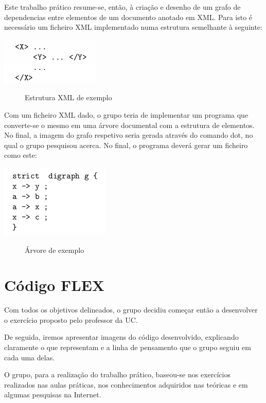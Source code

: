 \documentclass[a4paper]{article}
\begin{document}
Este trabalho prático resume-se, então, à criação e desenho de um grafo de dependencias entre elementos de um documento anotado em XML.
Para isto é necessário um ficheiro XML implementado numa estrutura semelhante à seguinte:

\begin{center}
	\includegraphics{enunciado1}
	\begin{figure}[!ht]
	\caption{Estrutura XML de exemplo}
	\end{figure}
\end{center}

Com um ficheiro XML dado, o grupo teria de implementar um programa que converte-se o mesmo em uma árvore documental com a estrutura de elementos. No final, a imagem do grafo respetivo seria gerada através do comando dot, no qual o grupo pesquisou acerca.
No final, o programa deverá gerar um ficheiro como este:

\begin{center}
	\includegraphics{enunciado2}
	\begin{figure}[!ht]
	\caption{Árvore de exemplo}
	\end{figure}
\end{center}

\section{Código FLEX}
\label{sec:flex}

Com todos os objetivos delineados, o grupo decidiu começar então a desenvolver o exercício proposto pelo professor da UC.

De seguida, iremos apresentar imagens do código desenvolvido, explicando claramente o que representam e a linha de pensamento que o grupo seguiu em cada uma delas.

O grupo, para a realização do trabalho prático, baseou-se nos exercícios realizados nas aulas práticas, nos conhecimentos adquiridos nas teóricas e em algumas pesquisas na Internet.
\end{document}

